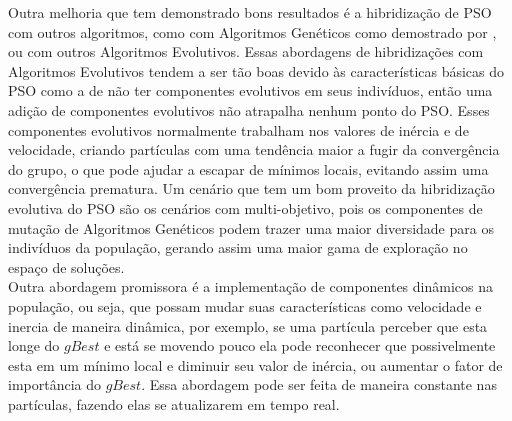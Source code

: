 \indent Outra melhoria que tem demonstrado bons resultados é a hibridização de PSO com outros algoritmos, como com Algoritmos Genéticos como demostrado por \cite{carvalho2014}, ou com outros Algoritmos Evolutivos.
%
Essas abordagens de hibridizações com Algoritmos Evolutivos tendem a ser tão boas devido às características básicas do PSO como a de não ter componentes evolutivos em seus indivíduos, então uma adição de componentes evolutivos não atrapalha nenhum ponto do PSO.
Esses componentes evolutivos normalmente trabalham nos valores de inércia e de velocidade, criando partículas com uma tendência maior a fugir da convergência do grupo, o que pode ajudar a escapar de mínimos locais, evitando assim uma convergência prematura.
%
Um cenário que tem um bom proveito da hibridização evolutiva do PSO são os cenários com multi-objetivo, pois os componentes de mutação de Algoritmos Genéticos podem trazer uma maior diversidade para os indivíduos da população, gerando assim uma maior gama de exploração no espaço de soluções.\\
\indent Outra abordagem promissora é a implementação de componentes dinâmicos na população, ou seja, que possam mudar suas características como velocidade e inercia de maneira dinâmica, por exemplo, se uma partícula perceber que esta longe do $gBest$ e está se movendo pouco ela pode reconhecer que possivelmente esta em um mínimo local e diminuir seu valor de inércia, ou aumentar o fator de importância do $gBest$.
%
Essa abordagem pode ser feita de maneira constante nas partículas, fazendo elas se atualizarem em tempo real.
